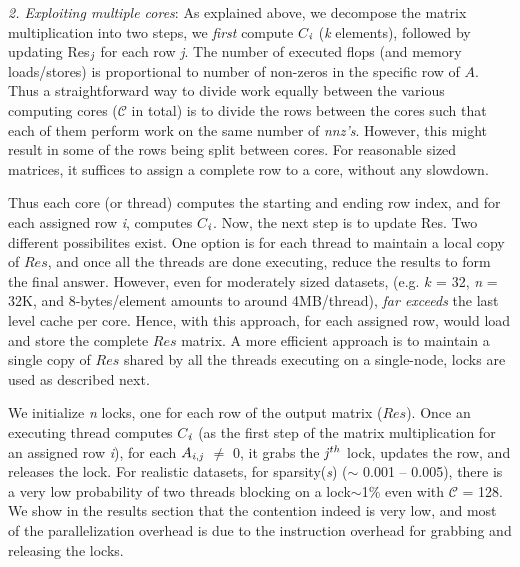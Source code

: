 
     \vspace*{0.1in}
     {\it{2. Exploiting multiple cores}}: As explained above, we
     decompose the matrix multiplication into two steps, %
     we {\it{first}} compute
     $C$$_{{\it{i}}}$ ({\it{k}} elements), followed by updating 
     Res$_{{\it{j}}}$ for each row {\it{j}}. The number of executed 
     flops (and memory loads/stores) is proportional to number of
     non-zeros in the specific row of $A$. Thus a straightforward way
     to divide work equally between the various computing cores
     ($\mathcal{C}$ in total) is to divide the rows between the cores
     such that each of them perform work on the same number of {\it{nnz's}}. However,
     this might result in some of the rows being split between cores.
     For reasonable sized matrices, it suffices to assign a complete
     row to a core, without any slowdown.

     Thus each core (or thread) computes the starting and ending row
     index, and for each assigned row {\it{i}}, computes
     $C$$_{{\it{i}}}$. Now, the next step is to update Res.
     Two different possibilites exist. One option is for each thread
     to maintain a local copy of $Res$, and once all the threads are
     done executing, reduce the results to form the final answer.
     However, even for moderately sized datasets, (e.g. $k$ = 32,
     {\it{n}} = 32K, and 8-bytes/element amounts to around
     4MB/thread), 
     {\it{far exceeds}} the last level cache per core.
     Hence, with this approach, for each assigned row,  would load and store the
     complete $Res$ matrix. A more efficient approach is to maintain a
     single copy of $Res$ shared by all the threads executing on a
     single-node, locks are used as described next. 

     We initialize {\it{n}} locks, one for each row of the output
     matrix ($Res$).
     Once an executing thread computes $C$$_{{\it{i}}}$ (as the first
     step of the matrix multiplication 
     for an assigned row {\it{i}}), 
     for each  $A_{{\it{i}},{\it{j}}}$ $\neq$ 0, it grabs the
     ${\it{j}}^{th}$ lock, updates the row, and releases the lock. 
     For realistic datasets, for sparsity({\it{s}})
     ($\sim$
     0.001 -- 0.005), there is a very low probability of two threads
     blocking on a lock$\sim$1\% even with ${\mathcal{C}}$ =
     128. We show in the results section that the contention indeed is
     very low, and most of the parallelization overhead is due to the
     instruction overhead for grabbing and releasing the locks.

